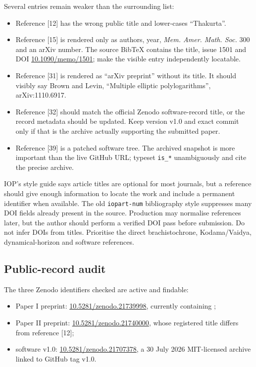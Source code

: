 \documentclass[11pt,a4paper]{article}
\begin{document}
Several entries remain weaker than the surrounding list:
\begin{itemize}
  \item Reference [12] has the wrong public title and lower-cases ``Thakurta''.
  \item Reference [15] is rendered only as authors, year, \emph{Mem. Amer. Math. Soc.} 300 and
  an arXiv number. The source BibTeX contains the title, issue 1501 and DOI
  \href{https://doi.org/10.1090/memo/1501}{10.1090/memo/1501}; make the visible entry
  independently locatable.
  \item Reference [31] is rendered as ``arXiv preprint'' without its title. It should visibly
  say Brown and Levin, ``Multiple elliptic polylogarithms'', arXiv:1110.6917.
  \item Reference [32] should match the official Zenodo software-record title, or the record
  metadata should be updated. Keep version v1.0 and exact commit only if that is the archive
  actually supporting the submitted paper.
  \item Reference [39] is a patched software tree. The archived snapshot is more important than
  the live GitHub URL; typeset \texttt{is\_*} unambiguously and cite the precise archive.
\end{itemize}

IOP's style guide says article titles are optional for most journals, but a reference should
give enough information to locate the work and include a permanent identifier when available.
The old \texttt{iopart-num} bibliography style suppresses many DOI fields already present in the
source. Production may normalise references later, but the author should perform a verified DOI
pass before submission. Do not infer DOIs from titles. Prioritise the direct brachistochrone,
Kodama/Vaidya, dynamical-horizon and software references.

\subsection{Public-record audit}

The three Zenodo identifiers checked are active and findable:
\begin{itemize}
  \item Paper I preprint: \href{https://doi.org/10.5281/zenodo.21739998}{10.5281/zenodo.21739998},
  currently containing ;
  \item Paper II preprint: \href{https://doi.org/10.5281/zenodo.21740000}{10.5281/zenodo.21740000},
  whose registered title differs from reference [12];
  \item software v1.0: \href{https://doi.org/10.5281/zenodo.21707378}{10.5281/zenodo.21707378},
  a 30 July 2026 MIT-licensed archive linked to GitHub tag v1.0.
\end{itemize}
\end{document}
